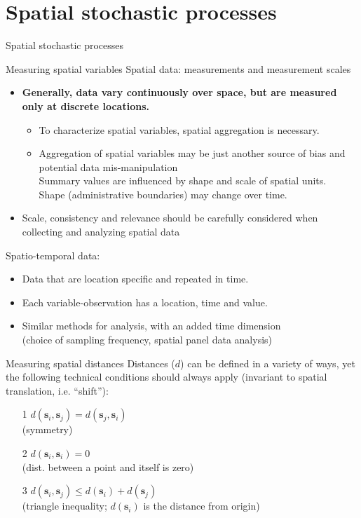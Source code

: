 \documentclass{beamer}
\begin{document}
\section{Spatial stochastic processes}
\begin{frame}{Spatial stochastic processes}
\end{frame}
\begin{frame}{Measuring spatial variables}
Spatial data: measurements and measurement scales
\begin{itemize}
    \item \textbf{Generally, data vary continuously over space, but are measured only at discrete locations.} 
    \begin{itemize}
        \item To characterize spatial variables, spatial aggregation is necessary.
        \item Aggregation of spatial variables may be just another source of bias and potential data mis-manipulation\\ 
        Summary values are influenced by shape and scale of spatial units.\\
        Shape (administrative boundaries) may change over time.
    \end{itemize}
    \item Scale, consistency and relevance should be carefully considered
when collecting and analyzing spatial data
\end{itemize}
\medskip
Spatio-temporal data:
\begin{itemize}
    \item Data that are location specific and repeated in time.
    \item Each variable-observation has a location, time and value.
    \item Similar methods for analysis, with an added time dimension \\(choice of sampling frequency, spatial panel data analysis)
\end{itemize}
\end{frame}
\begin{frame}{Measuring spatial distances}
Distances ($d$) can be defined in a variety of ways, yet the following technical conditions should always apply (invariant to spatial translation, i.e. ``shift''):\\
\medskip
\begin{enumerate} 
\item[1] $d(\bm{s}_i, \bm{s}_j) = d(\bm{s}_j, \bm{s}_i)$ \\ \smallskip (symmetry) 
\medskip
\item[2] $d(\bm{s}_i, \bm{s}_i) = 0$  \\ \smallskip (dist. between a point and itself is zero) 
\medskip
\item[3] $d(\bm{s}_i, \bm{s}_j) \leq d(\bm{s}_i) + d(\bm{s}_j)$  \\ \smallskip (triangle inequality; 
$d(\bm{s}_i)$ is the distance from origin) 
\end{enumerate}
\end{frame}
\end{document}
